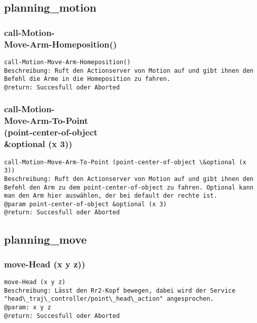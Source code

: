 \documentclass{suturo}
\begin{document}
\subsection{planning\_motion}

\subsubsection{call-Motion-\\
Move-Arm-Homeposition()}
\begin{verbatim}
call-Motion-Move-Arm-Homeposition()
Beschreibung: Ruft den Actionserver von Motion auf und gibt ihnen den Befehl die Arme in die Homeposition zu fahren.
@return: Succesfull oder Aborted
\end{verbatim}





\subsubsection{call-Motion-\\
Move-Arm-To-Point \\(point-center-of-object\\ \&optional (x 3))
}
\begin{verbatim}
call-Motion-Move-Arm-To-Point (point-center-of-object \&optional (x 3))
Beschreibung: Ruft den Actionserver von Motion auf und gibt ihnen den Befehl den Arm zu dem point-center-of-object zu fahren. Optional kann man den Arm hier auswählen, der bei default der rechte ist.
@param point-center-of-object &optional (x 3)
@return: Succesfull oder Aborted
\end{verbatim}


\subsection{planning\_move}

\subsubsection{move-Head (x y z))
}
\begin{verbatim}
move-Head (x y z)
Beschreibung: Lässt den Rr2-Kopf bewegen, dabei wird der Service "head\_traj\_controller/point\_head\_action" angesprochen.
@param: x y z 
@return: Succesfull oder Aborted
\end{verbatim}
\end{document}
